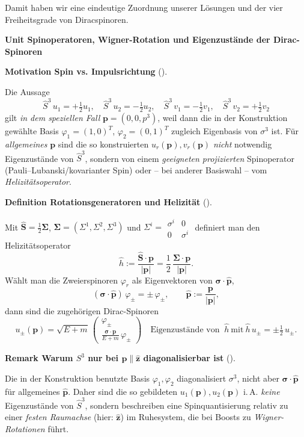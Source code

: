 \documentclass[10pt, letterpaper]{article}
\newcommand{\CustomHeading}[3]{%
  \par\medskip\noindent%
  \textbf{#1 #2} \textnormal{(#3)}.\enskip%
}
\newenvironment{DEF}[2]{\begin{unitbox}\CustomHeading{Definition}{#1}{#2}}{\end{unitbox}}
\newenvironment{REM}[2]{\begin{unitbox}\CustomHeading{Remark}{#1}{#2}}{\end{unitbox}}
\newenvironment{MOT}[2]{\begin{unitbox}\CustomHeading{Motivation}{#1}{#2}}{\end{unitbox}}
\newenvironment{unit}[1]
  {\begin{unitbox}\textbf{Unit #1}\par\smallskip}
  {\end{unitbox}}
\begin{document}
Damit haben wir eine eindeutige Zuordnung unserer Lösungen und der vier Freiheitsgrade von Diracspinoren.

\begin{unit}{Spinoperatoren, Wigner-Rotation und Eigenzustände der Dirac-Spinoren}

\begin{MOT}{Spin vs. Impulsrichtung}{}
Die Aussage
\[
\hat S^3\,u_1=+\tfrac12 u_1,\quad \hat S^3\,u_2=-\tfrac12 u_2,\quad
\hat S^3\,v_1=-\tfrac12 v_1,\quad \hat S^3\,v_2=+\tfrac12 v_2
\]
gilt \emph{in dem speziellen Fall} $\mathbf p=(0,0,p^3)$, weil dann die in der Konstruktion gewählte Basis $\varphi_1=(1,0)^T$, $\varphi_2=(0,1)^T$ zugleich Eigenbasis von $\sigma^3$ ist. Für \emph{allgemeines} $\mathbf p$ sind die so konstruierten $u_r(\mathbf p),v_r(\mathbf p)$ \emph{nicht} notwendig Eigenzustände von $\hat S^3$, sondern von einem \emph{geeigneten projizierten} Spinoperator (Pauli–Lubanski/kovarianter Spin) oder – bei anderer Basiswahl – vom \emph{Helizitätsoperator}.
\end{MOT}

\begin{DEF}{Rotationsgeneratoren und Helizität}{}
Mit $\hat{\mathbf S}=\tfrac12\boldsymbol{\Sigma}$, $\boldsymbol{\Sigma}=(\Sigma^1,\Sigma^2,\Sigma^3)$ und $\Sigma^i=\begin{smallmatrix}\sigma^i&0\\0&\sigma^i\end{smallmatrix}$ definiert man den Helizitätsoperator
\[
\hat h := \frac{\hat{\mathbf S}\cdot\mathbf p}{|\mathbf p|}
= \frac{1}{2}\,\frac{\boldsymbol{\Sigma}\cdot\mathbf p}{|\mathbf p|}.
\]
Wählt man die Zweierspinoren $\varphi_r$ als Eigenvektoren von $\boldsymbol{\sigma}\cdot \hat{\mathbf p}$,
\[
(\boldsymbol{\sigma}\cdot \hat{\mathbf p})\,\varphi_{\pm} = \pm\,\varphi_{\pm},\qquad \hat{\mathbf p}:=\frac{\mathbf p}{|\mathbf p|},
\]
dann sind die zugehörigen Dirac-Spinoren
\[
u_{\pm}(\mathbf p)=\sqrt{E+m}\,
\begin{pmatrix}
\varphi_{\pm}\\[2pt]
\frac{\boldsymbol{\sigma}\cdot\mathbf p}{E+m}\,\varphi_{\pm}
\end{pmatrix}
\quad\text{Eigenzustände von }\ \hat h\ \text{mit}\ \hat h\,u_{\pm}=\pm\tfrac12\,u_{\pm}.
\]
\end{DEF}

\begin{REM}{Warum $S^3$ nur bei $\mathbf p\parallel \hat{\mathbf z}$ diagonalisierbar ist}{}
Die in der Konstruktion benutzte Basis $\varphi_1,\varphi_2$ diagonalisiert $\sigma^3$, nicht aber $\boldsymbol{\sigma}\cdot \hat{\mathbf p}$ für allgemeines $\hat{\mathbf p}$. Daher sind die so gebildeten $u_1(\mathbf p),u_2(\mathbf p)$ i.\,A. \emph{keine} Eigenzustände von $\hat S^3$, sondern beschreiben eine Spinquantisierung relativ zu einer \emph{festen Raumachse} (hier: $\hat{\mathbf z}$) im Ruhesystem, die bei Boosts zu \emph{Wigner-Rotationen} führt.
\end{REM}


\end{unit}
\end{document}
